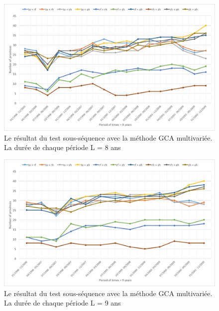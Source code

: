 \begin{figure}[h]
\begin{center}
\includegraphics[width = \linewidth]{../figures/chap5/multi_8.png}
\caption{Le résultat du test sous-séquence avec la méthode GCA multivariée. La durée de chaque période L = 8 ans }
\label{fig_multi8}	
\end{center}
\end{figure}

\begin{figure}[h]
\begin{center}
\includegraphics[width = \linewidth]{../figures/chap5/multi_9.png}
\caption{Le résultat du test sous-séquence avec la méthode GCA multivariée. La durée de chaque période L = 9 ans }
\label{fig_multi9}	
\end{center}
\end{figure}


